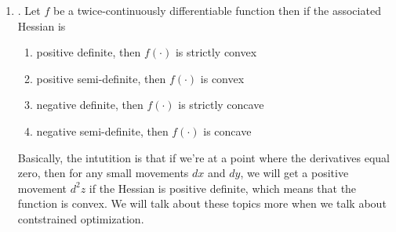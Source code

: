 \documentclass[12pt]{article}
\begin{document}
\begin{enumerate}
\begin{enumerate}
	\item\underline{}. Let $f$ be a twice-continuously differentiable function then if the associated
		Hessian is
		\begin{enumerate}
			\item positive definite, then $f(\cdot)$ is strictly convex
			\item positive semi-definite, then $f(\cdot)$ is convex
			\item negative definite, then $f(\cdot)$ is strictly concave
			\item negative semi-definite, then $f(\cdot)$ is concave
		\end{enumerate}
	Basically, the intutition is that  if we're at a point where the derivatives equal zero, then
	for any small movements $dx$ and $dy$, we will get a positive movement $d^2z$ if the Hessian is positive definite, which means that the function is convex. We will talk about these topics more when we talk about contstrained optimization.
\end{enumerate}


\begin{comment}


\end{comment}
\end{enumerate}
\end{document}
